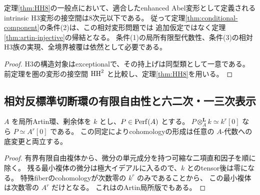 \begin{corollary}\label{cor:artin-tangent-bound}
定理\ref{thm:HH8}の一般点において、適合したenhanced Abel変形として定義される
intrinsic H3変形の接空間は8次元以下である。
従って定理\ref{thm:conditional-component}の条件(2)は、この相対変形問題では
追加仮定ではなく定理\ref{thm:artin-injective}の帰結となる。
条件(1)の局所有限型代数性、条件(3)の相対H3族の実現、全境界被覆は依然として必要である。
\end{corollary}
\begin{proof}
H3の構造対象はexceptionalで、その持上げは同型類として一意である。
前定理を圏の変形の接空間 $\operatorname{HH}^2$ と比較し、定理\ref{thm:HH8}を用いる。
\end{proof}

\subsection{相対反標準切断環の有限自由性と六二次・一三次表示}
\begin{lemma}[perfectな複体の特殊fiberからの認識]\label{lem:artin-perfect}
$A$ を局所Artin環、剰余体を $k$ とし、$P\in\operatorname{Perf}(A)$ とする。
$P\otimes_A^{\mathbf L}k\simeq k^r[0]$ なら $P\simeq A^r[0]$ である。
この同定によりcohomologyの形成は任意の $A$-代数への底変更と両立する。
\end{lemma}
\begin{proof}
有界有限自由複体から、微分の単元成分を持つ可縮な二項直和因子を順に除く。
残る最小複体の微分は極大イデアルに入るので、$k$ とのtensor後は零になる。
特殊fiberのcohomologyが次数零の $k^r$ のみであることから、
この最小複体は次数零の $A^r$ だけとなる。
これは\cite[Tag 0BDK]{StacksPerfect}のArtin局所版でもある。
\end{proof}

